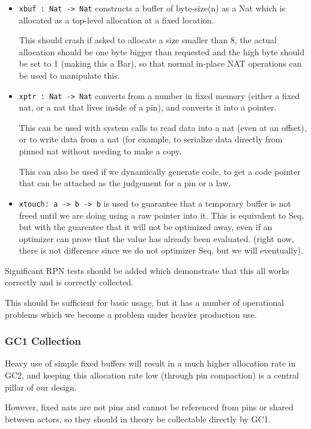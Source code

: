 \begin{itemize}
\item
    \lstinline|xbuf : Nat -> Nat| constructs a buffer of byte-size(n)
    as a Nat which is allocated as a top-level allocation at a fixed
    location.

    This should crash if asked to allocate a size smaller than 8, the
    actual allocation should be one byte bigger than requested and the
    high byte should be set to 1 (making this a Bar), so that normal
    in-place NAT operations can be used to manipulate this.
\item
    \lstinline|xptr : Nat -> Nat| converts from a number in fixed memory
    (either a fixed nat, or a nat that lives inside of a pin), and
    converts it into a pointer.

    This can be used with system calls to read data into a nat (even
    at an offset), or to write data from a nat (for example, to serialize
    data directly from pinned nat without needing to make a copy.

    This can also be used if we dynamically generate code, to get a code
    pointer that can be attached as the judgement for a pin or a law.
\item
    \lstinline|xtouch: a -> b -> b| is used to guarantee that a temporary
    buffer is not freed until we are doing using a raw pointer into it.
    This is equivalent to Seq, but with the guarentee that it will not
    be optimized away, even if an optimizer can prove that the value
    has already been evaluated. (right now, there is not difference
    since we do not optimizer Seq, but we will eventually).
\end{itemize}

Significant RPN tests should be added which demonstrate that this all
works correctly and is correctly collected.

This should be sufficient for basic usage, but it has a number of
operational problems which we become a problem under heavier production
use.

\subsubsection{GC1 Collection}

Heavy use of simple fixed buffers will result in a much higher allocation
rate in GC2, and keeping this allocation rate low (through pin compaction)
is a central pillar of our design.

However, fixed nats are not pins and cannot be referenced from pins or
shared between actors, so they should in theory be collectable directly
by GC1.

